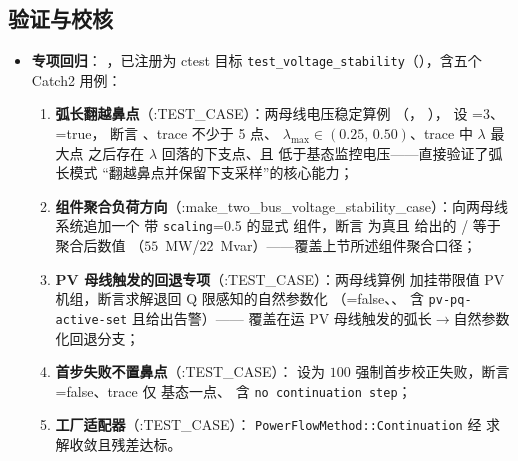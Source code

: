 \subsection{验证与校核}
\begin{itemize}
  \item \textbf{专项回归}：
        ，已注册为 ctest 目标
        \texttt{test\_voltage\_stability}（），含五个 Catch2 用例：
        \begin{enumerate}
          \item \textbf{弧长翻越鼻点}（:TEST\_CASE）：两母线电压稳定算例
                （，
                ），
                设 =3、=true，
                断言 、trace 不少于 5 点、
                $\lambda_{\max}\in(0.25,\,0.50)$、trace 中 $\lambda$ 最大点
                之后存在 $\lambda$ 回落的下支点、且
                 低于基态监控电压——直接验证了弧长模式
                “翻越鼻点并保留下支采样”的核心能力；
          \item \textbf{组件聚合负荷方向}（:make\_two\_bus\_voltage\_stability\_case）：向两母线系统追加一个
                带 \texttt{scaling}=0.5 的显式  组件，断言
                 为真且
                 给出的
                / 等于聚合后数值
                （$55$~MW/$22$~Mvar）——覆盖上节所述组件聚合口径；
          \item \textbf{PV 母线触发的回退专项}（:TEST\_CASE）：两母线算例
                加挂带限值 PV 机组，断言求解退回 Q 限感知的自然参数化
                （=false、、
                 含 \texttt{pv-pq-active-set} 且给出告警）——
                覆盖在运 PV 母线触发的弧长$\to$自然参数化回退分支；
          \item \textbf{首步失败不置鼻点}（:TEST\_CASE）： 设为
                $100$ 强制首步校正失败，断言 =false、trace 仅
                基态一点、 含 \texttt{no continuation step}；
          \item \textbf{工厂适配器}（:TEST\_CASE）：
                \texttt{PowerFlowMethod::Continuation} 经
                 求解收敛且残差达标。

\end{enumerate}
\end{itemize}
